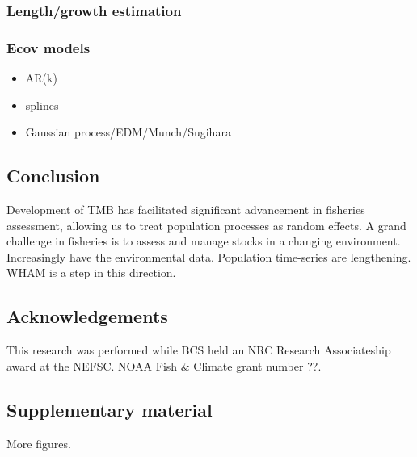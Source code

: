 \documentclass[]{article}
\providecommand{\tightlist}{%
  \setlength{\itemsep}{0pt}\setlength{\parskip}{0pt}}
\begin{document}
\hypertarget{lengthgrowth-estimation}{%
\subsubsection{Length/growth estimation}\label{lengthgrowth-estimation}}

\hypertarget{ecov-models}{%
\subsubsection{Ecov models}\label{ecov-models}}

\begin{itemize}
\tightlist
\item
  AR(k)
\item
  splines
\item
  Gaussian process/EDM/Munch/Sugihara
\end{itemize}

\hypertarget{conclusion}{%
\subsection{Conclusion}\label{conclusion}}

Development of TMB has facilitated significant advancement in fisheries
assessment, allowing us to treat population processes as random effects.
A grand challenge in fisheries is to assess and manage stocks in a
changing environment. Increasingly have the environmental data.
Population time-series are lengthening. WHAM is a step in this
direction.

\hypertarget{acknowledgements}{%
\subsection*{Acknowledgements}\label{acknowledgements}}

This research was performed while BCS held an NRC Research Associateship
award at the NEFSC. NOAA Fish \& Climate grant number ??.

\pagebreak

\hypertarget{supplementary-material}{%
\subsection*{Supplementary material}\label{supplementary-material}}

More figures.

\pagebreak
\end{document}
